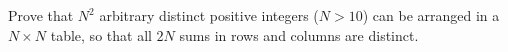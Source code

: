 Prove that $N^2$ arbitrary distinct positive integers ($N>10$) can be arranged in a $N\times N$ table, so that all $2N$ sums in rows and columns are distinct.